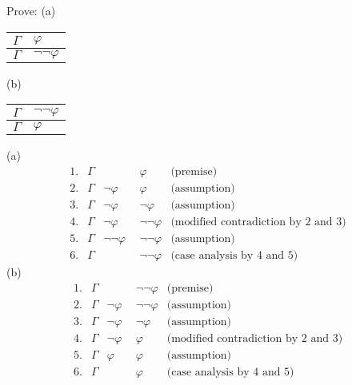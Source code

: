 \documentclass{ximera}
\begin{document}
\begin{problem} Prove:
    (a) \begin{tabular}{ll}
        $\Gamma$ & $\varphi$\\
        \hline
        $\Gamma$ & $\neg\neg\varphi$\\
        \end{tabular}
    (b) \begin{tabular}{ll}
        $\Gamma$ & $\neg\neg\varphi$\\
        \hline
        $\Gamma$ & $\varphi$\\
        \end{tabular}
    \begin{solution} 
        (a) 
        $$
            \begin{aligned}
                1. &\Gamma &                ~~&\varphi         &\text{(premise)}\\
                2. &\Gamma &\neg\varphi     ~~&\varphi         &\text{(assumption)}\\
                3. &\Gamma &\neg\varphi     ~~&\neg\varphi     &\text{(assumption)}\\
                4. &\Gamma &\neg\varphi     ~~&\neg\neg\varphi &\text{(modified contradiction by 2 and 3)}\\
                5. &\Gamma &\neg\neg\varphi ~~&\neg\neg\varphi &\text{(assumption)}\\
                6. &\Gamma &                ~~&\neg\neg\varphi &\text{(case analysis by 4 and 5)}
            \end{aligned}
        $$
        (b)
        $$
            \begin{aligned}
                1. &\Gamma &            ~~&\neg\neg\varphi         &\text{(premise)}\\
                2. &\Gamma &\neg\varphi ~~&\neg\neg\varphi         &\text{(assumption)}\\
                3. &\Gamma &\neg\varphi ~~&\neg\varphi             &\text{(assumption)}\\
                4. &\Gamma &\neg\varphi ~~&\varphi                 &\text{(modified contradiction by 2 and 3)}\\
                5. &\Gamma &\varphi     ~~&\varphi                 &\text{(assumption)}\\
                6. &\Gamma &            ~~&\varphi                 &\text{(case analysis by 4 and 5)}                 
            \end{aligned}
        $$

    \end{solution}
\end{problem}
\end{document}
